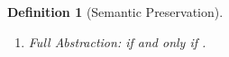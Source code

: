 \documentclass[preprint,11pt]{elsarticle}
\newtheorem{definition}{Definition}[section]
\begin{document}
{\begin{definition}[Semantic Preservation]
\begin{enumerate}[1.]
\begin{enumerate}
			\item	Soundness:   
				If  $\wtytraargi{\mapt{\Gamma}}{}{\mapt{\Delta}}{\map{P}}{\mapt{\Delta'}}{Q}{2}{2}$
				then  $\exists P', \Delta''$ s.t.  \\
				(i)~$\stytraargi{\Gamma}{\tau}{\Delta}{P}{\Delta''}{P'}{1}{1}$
				and 
				(ii)~
${\mapt{\Gamma}};{\mapt{\Delta''}}\proves_2 {\map{P'}}{\,\wb_2\,}
{\mapt{\Delta'}}\proves_2 {Q}$.

		\end{enumerate}
		
		\item \emph{Full Abstraction:} 
		if and only if 
		.
		
	\end{enumerate}
\end{definition}


}
\end{document}
